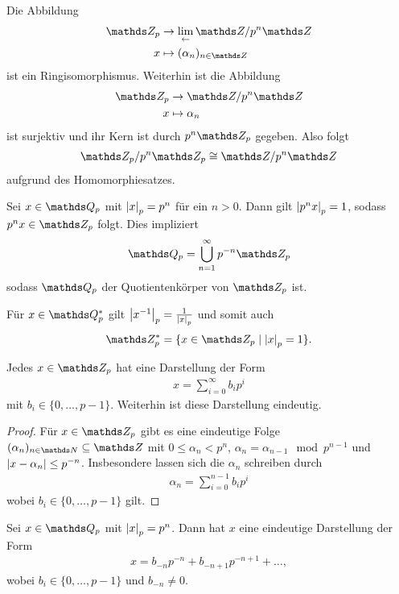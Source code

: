 \begin{thm}
Die Abbildung
\begin{align*}
\Z_p &\to \lim_{\leftarrow} \Z/p^n\Z\\
x &\mapsto (\alpha_n)_{n\in \Z}
\end{align*}
ist ein Ringisomorphismus.
Weiterhin ist die Abbildung
\begin{align*}
\Z_p &\to \Z /p^n \Z\\
x &\mapsto \alpha_n
\end{align*}
ist surjektiv und ihr Kern ist durch $p^n\Z_p$ gegeben.
Also folgt
\begin{align*}
\Z_p /p^n \Z_p \cong \Z /p^n \Z
\end{align*}
aufgrund des Homomorphiesatzes.
\end{thm}

\begin{lem}
Sei $x\in \Q_p$ mit $\left\vert x\right\vert_p=p^n$ für ein $n>0$.
Dann gilt $\left\vert p^n x\right\vert_p=1$, sodass $p^nx\in \Z_p$ folgt.
Dies impliziert
\begin{align*}
\Q_p=\bigcup_{n=1}^\infty p^{-n}\Z_p
\end{align*}
sodass $\Q_p$ der Quotientenkörper von $\Z_p$ ist.
\end{lem}

Für $x\in \Q_p^\ast$ gilt $\left\vert x^{-1}\right\vert_p=\frac{1}{\left\vert x\right\vert_p}$ und somit auch
\begin{align*}
\Z_p^\ast=\{x\in \Z_p \mid \abs{x}_p=1\}.
\end{align*}



\begin{prop}
Jedes $x\in \Z_p$ hat eine Darstellung der Form
\begin{align*}
x=\sum_{i=0}^\infty b_i p^i
\end{align*}
mit $b_i \in \{0,\dots,p-1\}$. Weiterhin ist diese Darstellung eindeutig.
\end{prop}
\begin{proof}
Für $x \in \Z_p$ gibt es eine eindeutige Folge $(\alpha_n)_{n\in \N}\subseteq \Z$ mit $0 \leq \alpha_n<p^n$, $\alpha_n=\alpha_{n-1} \mod p^{n-1}$ und $\left\vert x-\alpha_n\right\vert\leq p^{-n}$.
Insbesondere lassen sich die $\alpha_n$ schreiben durch
\begin{align*}
\alpha_n=\sum_{i=0}^{n-1} b_i p^i
\end{align*}
wobei $b_i \in\{0,\dots,p-1\}$ gilt.
\end{proof}

\begin{prop}
Sei $x\in \Q_p$ mit $\left\vert x\right\vert_p=p^n$. Dann hat $x$ eine eindeutige Darstellung der Form
\begin{align*}
x=b_{-n}p^{-n}+b_{-n+1}p^{-n+1}+\dots,
\end{align*}
wobei $b_i \in \{0,\dots,p-1\}$ und $b_{-n}\not =0$.
\end{prop}

